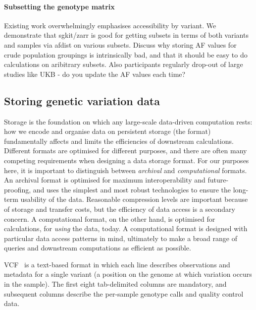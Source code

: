 \documentclass[a4paper,num-refs]{oup-contemporary}
\begin{document}
\paragraph{Subsetting the genotype matrix}
Existing work overwhelmingly emphasises accessibility by variant.
We demonstrate that sgkit/zarr is good for getting subsets
in terms of both variants and samples via afdist on various subsets.
Discuss why storing AF values for crude population groupings is
intrinsically bad, and that it should be easy to do calculations
on aribitrary subsets. Also participants regularly drop-out of
large studies like UKB - do you update the AF values each time?


\subsection{Storing genetic variation data}
Storage is the foundation on which any large-scale data-driven computation
rests: how we encode and organise data on persistent storage (the format)
fundamentally affects and limits the efficiencies of downstream calculations.
Different formats are optimised for different purposes, and there are
often many competing requirements when designing a data storage format.
For our  purposes here, it is important to distinguish between \emph{archival}
and \emph{computational} formats. An archival format is optimised for
maximum interoperability and future-proofing, and uses the simplest and
most robust technologies to ensure the long-term usability of the data.
Reasonable compression levels are important because
of storage and transfer costs, but the efficiency of data access is a
secondary concern.
A computational format, on the other hand, is optimised
for calculations, for \emph{using} the data, today. A computational format
is designed with particular data access patterns in mind, ultimately
to make a broad range of queries and downstream computations as efficient as
possible.

VCF~\citep{danecek2011variant} is a text-based format in which each line
describes observations
and metadata for a single variant (a position on the genome at which
variation occurs in the sample). The first eight tab-delimited
columns are mandatory, and subsequent columns describe the per-sample
genotype calls and quality control data.
\end{document}
